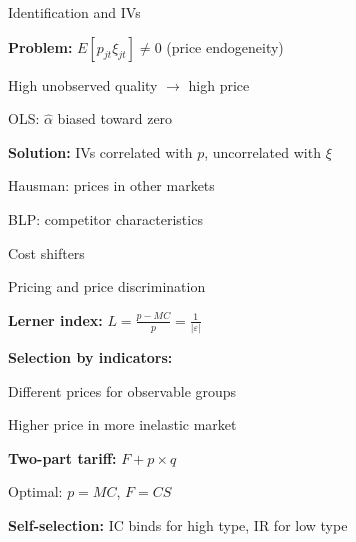 \documentclass[notes,11pt, aspectratio=169]{beamer}
\newenvironment{wideitemize}{\itemize\addtolength{\itemsep}{10pt}}{\enditemize}
\begin{document}
\begin{frame}{Identification and IVs}
	\begin{wideitemize}
		\item \textbf{Problem:} $E[p_{jt} \xi_{jt}] \neq 0$ (price endogeneity)
		\item High unobserved quality $\rightarrow$ high price
		\item OLS: $\hat{\alpha}$ biased toward zero
		\item \textbf{Solution:} IVs correlated with $p$, uncorrelated with $\xi$
		\begin{wideitemize}
			\vspace{5pt}
			\item Hausman: prices in other markets
			\item BLP: competitor characteristics
			\item Cost shifters
		\end{wideitemize}
	\end{wideitemize}
\end{frame}

\begin{frame}{Pricing and price discrimination}
	\begin{wideitemize}
		\item \textbf{Lerner index:} $L = \frac{p - MC}{p} = \frac{1}{|\varepsilon|}$
		\item \textbf{Selection by indicators:}
		\begin{wideitemize}
			\vspace{5pt}
			\item Different prices for observable groups
			\item Higher price in more inelastic market
		\end{wideitemize}
		\item \textbf{Two-part tariff:} $F + p \times q$
		\begin{wideitemize}
			\vspace{5pt}
			\item Optimal: $p = MC$, $F = CS$
		\end{wideitemize}
		\item \textbf{Self-selection:} IC binds for high type, IR for low type
	\end{wideitemize}
\end{frame}
\end{document}
